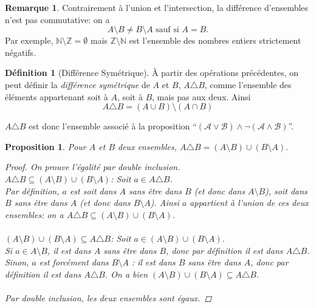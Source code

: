 \documentclass[oneside,12pt,french,table]{book}
\newtheorem{prop}{Proposition}[section]
\theoremstyle{definition}
\theoremstyle{definition}
\theoremstyle{definition}
\newtheorem{definition}{Définition}[chapter]
\newtheorem*{remark}{Remarque}
\begin{document}
\begin{remark}
Contrairement à l'union et l'intersection, la différence d'ensembles n'est pas commutative: on a
$$A \setminus B \neq B \setminus A \text{ sauf si } A = B.$$
Par exemple, $\mathbb{N} \setminus \mathbb{Z} = \emptyset$ mais $\mathbb{Z} \setminus \mathbb{N}$ est l'ensemble des nombres entiers strictement négatifs.
\end{remark}
\begin{definition}[Différence Symétrique]
À partir des opérations précédentes, on peut définir la \textit{différence symétrique} de $A$ et $B$, $A \triangle B$, comme l'ensemble des éléments appartenant soit à $A$, soit à $B$, mais pas aux deux. Ainsi $$A \triangle B = (A \cup B) \setminus (A \cap B)$$
\end{definition}
\noindent $A \triangle B$ est donc l'ensemble associé à la proposition ``$(\mathcal{A} \vee \mathcal{B}) \wedge \neg (\mathcal{A} \wedge \mathcal{B})$''. \\
\begin{prop}
Pour $A$ et $B$ deux ensembles, $A \triangle B = (A \setminus B) \cup (B \setminus A)$.
\begin{proof}
On prouve l'égalité par double inclusion. \\
\underline{$A \triangle B \subseteq (A \setminus B) \cup (B \setminus A)$}: Soit $a \in A \triangle B$. \\
Par définition, $a$ est soit dans $A$ sans être dans $B$ (et donc dans $A \setminus B$), soit dans $B$ sans être dans $A$ (et donc dans $B \setminus A$). Ainsi $a$ appartient à l'union de ces deux ensembles: on a $A \triangle B \subseteq (A \setminus B) \cup (B \setminus A)$. \\ \\
\underline{$(A \setminus B) \cup (B \setminus A) \subseteq A \triangle B$}: Soit $a \in (A \setminus B) \cup (B \setminus A)$. \\
Si $a \in A \setminus B$, il est dans $A$ sans être dans $B$, donc par définition il est dans $A \triangle B$. Sinon, $a$ est forcément dans $B \setminus A$ : il est dans $B$ sans être dans $A$, donc par définition il est dans $A \triangle B$. On a bien $(A \setminus B) \cup (B \setminus A) \subseteq A \triangle B$. \\ \\
Par double inclusion, les deux ensembles sont égaux.
\end{proof}
\end{prop}
\end{document}
